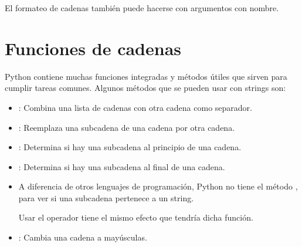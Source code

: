 El formateo de cadenas también puede hacerse con argumentos con nombre.


\section{Funciones de cadenas}

Python contiene muchas funciones integradas y métodos útiles que sirven para cumplir tareas comunes. Algunos métodos que se pueden usar con strings son:

\begin{itemize}
  \item {}: Combina una lista de cadenas con otra cadena como separador.
  

  \item {}: Reemplaza una subcadena de una cadena por otra cadena.



  \item {}: Determina si hay una subcadena al principio de una cadena.


  \item {}: Determina si hay una subcadena al final de una cadena.
  

  \item A diferencia de otros lenguajes de programación, Python no tiene el método , para ver si una subcadena pertenece a un string.\smallskip
  
  Usar el operador  tiene el mismo efecto que tendría dicha función.



  \item {}: Cambia una cadena a mayúsculas.
  

\end{itemize}
